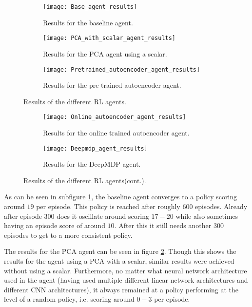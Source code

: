 \begin{figure}[h]
	\centering
	\begin{subfigure}[b]{0.75\textwidth}
		\texttt{[image: Base\_agent\_results]}
		\caption{Results for the baseline agent.}
		\label{fig:results-base} 
	\end{subfigure}
	\begin{subfigure}[b]{0.75\textwidth}
		\texttt{[image: PCA\_with\_scalar\_agent\_results]}
		\caption{Results for the PCA agent using a scalar.}
		\label{fig:results-pca}
	\end{subfigure}
	\begin{subfigure}[b]{0.75\textwidth}
		\texttt{[image: Pretrained\_autoencoder\_agent\_results]}
		\caption{Results for the pre-trained autoencoder agent.}
		\label{fig:results-ae}
	\end{subfigure}
	\caption{Results of the different RL agents.}
\end{figure}%
\begin{figure}[ht]\ContinuedFloat
	\begin{subfigure}[b]{0.75\textwidth}
		\texttt{[image: Online\_autoencoder\_agent\_results]}
		\caption{Results for the online trained autoencoder agent.}
		\label{fig:results-online-ae}
	\end{subfigure}
	\begin{subfigure}[b]{0.75\textwidth}
		\texttt{[image: Deepmdp\_agent\_results]}
		\caption{Results for the DeepMDP agent.}
		\label{fig:results-deepmdp}
	\end{subfigure}
	\caption{Results of the different RL agents(cont.).}
	\label{fig:results-agents}
\end{figure}

As can be seen in subfigure \ref{fig:results-base}, the baseline agent converges to a policy scoring around $19$ per episode. This policy is reached after roughly $600$ episodes. Already after episode $300$ does it oscillate around scoring $17-20$ while also sometimes having an episode score of around $10$. After this it still needs another $300$ episodes to get to a more consistent policy.

The results for the PCA agent can be seen in figure \ref{fig:results-pca}. Though this shows the results for the agent using a PCA with a scalar, similar results were achieved without using a scalar. Furthermore, no matter what neural network architecture used in the agent (having used multiple different linear network architectures and different CNN architectures), it always remained at a policy performing at the level of a random policy, i.e. scoring around $0-3$ per episode.

